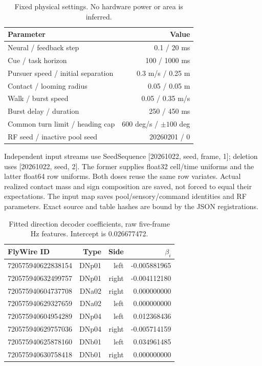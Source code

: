 \documentclass[10pt,letterpaper]{article}
\begin{document}
\begin{table}[H]
\centering\small
\caption{Fixed physical settings. No hardware power or area is inferred.}
\begin{tabular}{lr}
\toprule
Parameter & Value\\
\midrule
Neural / feedback step & 0.1 / 20 ms\\
Cue / task horizon & 100 / 1000 ms\\
Pursuer speed / initial separation & 0.3 m/s / 0.25 m\\
Contact / looming radius & 0.05 / 0.05 m\\
Walk / burst speed & 0.05 / 0.35 m/s\\
Burst delay / duration & 250 / 450 ms\\
Common turn limit / heading cap & 600 deg/s / $\pm100$ deg\\
RF seed / inactive pool seed & 20260201 / 0\\
\bottomrule
\end{tabular}
\end{table}

Independent input streams use SeedSequence [20261022, seed, frame, 1]; deletion uses [20261022, seed, 2]. The former supplies float32 cell/time uniforms and the latter float64 row uniforms. Both doses reuse the same row variates. Actual realized contact mass and sign composition are saved, not forced to equal their expectations. The input map saves pool/sensory/command identities and RF parameters. Exact source and table hashes are bound by the JSON registrations.

\begin{table}[H]
\centering\small
\caption{Fitted direction decoder coefficients, raw five-frame Hz features. Intercept is 0.026677472.}
\begin{tabular}{lrrr}
\toprule
FlyWire ID & Type & Side & $\beta_i$\\
\midrule
720575940622838154 & DNp01 & left & -0.005881965\\
720575940632499757 & DNp01 & right & -0.004112180\\
720575940604737708 & DNa02 & right & 0.000000000\\
720575940629327659 & DNa02 & left & 0.000000000\\
720575940604954289 & DNp04 & left & 0.012368436\\
720575940629757036 & DNp04 & right & -0.005714159\\
720575940625878160 & DNb01 & left & 0.034961485\\
720575940630758418 & DNb01 & right & 0.000000000\\
\bottomrule
\end{tabular}
\end{table}
\end{document}
